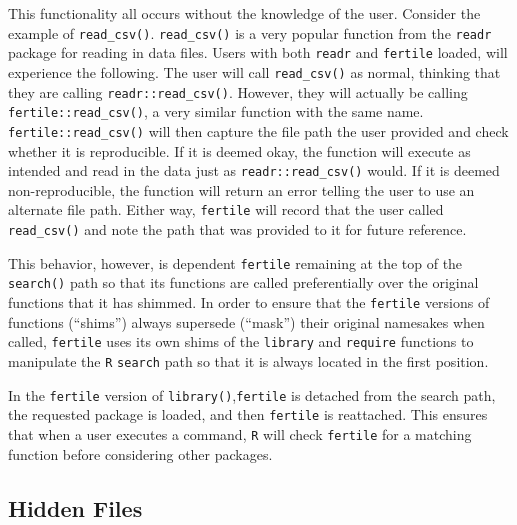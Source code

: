 \documentclass[12pt,twoside]{reedthesis}
\begin{document}
This functionality all occurs without the knowledge of the user.
Consider the example of \texttt{read\_csv()}. \texttt{read\_csv()} is a
very popular function from the \texttt{readr} package for reading in
data files. Users with both \texttt{readr} and \texttt{fertile} loaded,
will experience the following. The user will call \texttt{read\_csv()}
as normal, thinking that they are calling \texttt{readr::read\_csv()}.
However, they will actually be calling \texttt{fertile::read\_csv()}, a
very similar function with the same name. \texttt{fertile::read\_csv()}
will then capture the file path the user provided and check whether it
is reproducible. If it is deemed okay, the function will execute as
intended and read in the data just as \texttt{readr::read\_csv()} would.
If it is deemed non-reproducible, the function will return an error
telling the user to use an alternate file path. Either way,
\texttt{fertile} will record that the user called \texttt{read\_csv()}
and note the path that was provided to it for future reference.

This behavior, however, is dependent \texttt{fertile} remaining at the
top of the \texttt{search()} path so that its functions are called
preferentially over the original functions that it has shimmed. In order
to ensure that the \texttt{fertile} versions of functions (``shims'')
always supersede (``mask'') their original namesakes when called,
\texttt{fertile} uses its own shims of the \texttt{library} and
\texttt{require} functions to manipulate the \texttt{R} \texttt{search}
path so that it is always located in the first position.

In the \texttt{fertile} version of \texttt{library()},\texttt{fertile}
is detached from the search path, the requested package is loaded, and
then \texttt{fertile} is reattached. This ensures that when a user
executes a command, \texttt{R} will check \texttt{fertile} for a
matching function before considering other packages.

\subsection{Hidden Files}\label{hidden-files}
\end{document}
